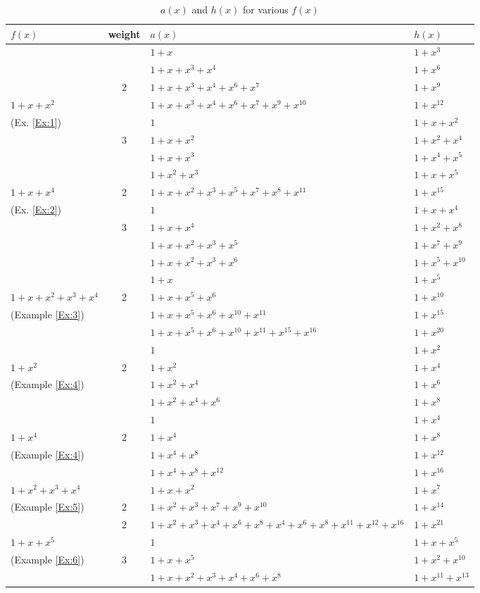 \begin{table}[htbp]
\caption{$a(x)$ and $h(x)$ for various $f(x)$}
\centering
\begin{tabularx}{1\textwidth}{l|cXl} 
\toprule
$f(x)$ & weight & $a(x)$ & $h(x)$\\
\midrule
 &  & $1+x$ & $1+x^{3}$ \\
&  &$1+x+x^3+x^4$ & $1+x^{6}$  \\
& 2 &$1+x+x^3+x^4+x^6+x^{7}$ &  $1+x^{9}$ \\
$1+x+x^2$&& $1+x+x^3+x^4+x^6+x^{7}+x^9+x^{10}$&  $1+x^{12}$ \\
\cline{2-4}
(Ex. \ref{Ex:1})& &$1$ & $1+x+x^2$\\ 
& 3&$1+x+x^2$ &  $1+x^2+x^4$\\
& &$1+x+x^3$ & $1+x^4+x^5$\\
& &$1+x^2+x^3$ & $1+x+x^5$ \\
\cline{1-4}
$1+x+x^4$&2& $1 +x +x^2 +x^3+x^5+x^7+x^8+x^{11}$&  $1+x^{15}$ \\
\cline{2-4}
(Ex. \ref{Ex:2})& &$1$ & $1+x+x^4$\\ 
& 3&$1+x+x^4$ &  $1+x^2+x^8$\\
& &$1+x+x^2+x^3+x^5$ & $1+x^7+x^9$\\
& &$1+x+x^2+x^3+x^6$ & $1+x^5+x^{10}$ \\
\cline{1-4}
&&$1+x$ &$1+x^5$\\ 
$1+x+x^2+x^3+x^4$&2&$1+x+x^5+x^6$ &$1+x^{10}$  \\
(Example \ref{Ex:3})&&$1+x+x^5+x^6+x^{10}+x^{11}$ & $1+x^{15}$ \\
&&$1+x+x^5+x^6+x^{10}+x^{11}+x^{15}+x^{16}$ &$1+x^{20}$  \\
\cline{1-4}
&&$1$ & $1+x^2$\\ 
$1+x^2$&2&$1+x^2$ & $1+x^4$ \\
(Example \ref{Ex:4})&&$1+x^2+x^4$ & $1+x^6$\\
&&$1+x^2+x^4+x^6$ & $1+x^8$\\
\cline{1-4}
&&$1$ & $1+x^4$\\ 
$1+x^4$&2&$1+x^4$ & $1+x^8$ \\
(Example \ref{Ex:4})&&$1+x^4+x^8$ & $1+x^{12}$\\
&&$1+x^4+x^8+x^{12}$ & $1+x^{16}$\\
\cline{1-4}
$1+x^2+x^3+x^4$&&$1+x+x^2$& $1+x^{7}$ \\
(Example \ref{Ex:5})&2&$1+x^2+x^3+x^7+x^9+x^{10}$	& $1+x^{14}$ \\
\cline{1-4}
&2&$1+x^2+x^3+x^4+x^6+x^8+x^{4}+x^{6}+x^{8}+x^{11}+x^{12}+x^{16}$ &  $1+x^{21}$\\
\cline{2-4}
$1+x+x^5$&&$1$ & $1+x+x^{5}$\\ 
(Example \ref{Ex:6})&3&$1+x+x^5$ &  $1+x^2+x^{10}$\\
&&$1+x+x^2+x^3+x^4+x^{6}+x^{8}$ & $1+x^{11}+x^{13}$\\
\bottomrule
\end{tabularx}
\label{examples-table}
\end{table}






